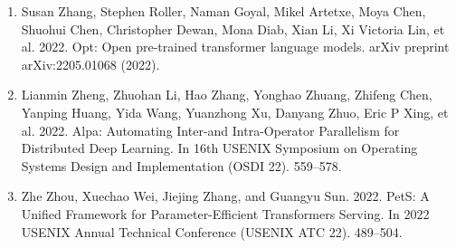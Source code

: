 \documentclass[11pt,UTF8,fontset=fandol]{ctexart}
\begin{document}
\begin{enumerate}[leftmargin=2.2em,labelsep=0.6em,itemsep=0.25em]
\item Susan Zhang, Stephen Roller, Naman Goyal, Mikel Artetxe, Moya Chen, Shuohui Chen, Christopher Dewan, Mona Diab, Xian Li, Xi Victoria Lin, et al. 2022. Opt: Open pre-trained transformer language models. arXiv preprint arXiv:2205.01068 (2022).
\item Lianmin Zheng, Zhuohan Li, Hao Zhang, Yonghao Zhuang, Zhifeng Chen, Yanping Huang, Yida Wang, Yuanzhong Xu, Danyang Zhuo, Eric P Xing, et al. 2022. Alpa: Automating Inter-and Intra-Operator Parallelism for Distributed Deep Learning. In 16th USENIX Symposium on Operating Systems Design and Implementation (OSDI 22). 559--578.
\item Zhe Zhou, Xuechao Wei, Jiejing Zhang, and Guangyu Sun. 2022. PetS: A Unified Framework for Parameter-Efficient Transformers Serving. In 2022 USENIX Annual Technical Conference (USENIX ATC 22). 489--504.
\end{enumerate}
\end{document}
